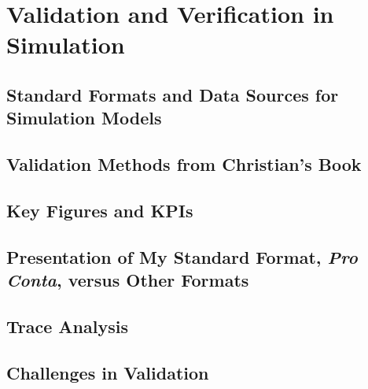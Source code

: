 \section{Validation and Verification in Simulation}
\subsection{Standard Formats and Data Sources for Simulation Models}
\subsection{Validation Methods from Christian's Book}
\subsection{Key Figures and KPIs}
\subsection{Presentation of My Standard Format, \emph{Pro Conta}, versus Other Formats}
\subsection{Trace Analysis}
\subsection{Challenges in Validation}
